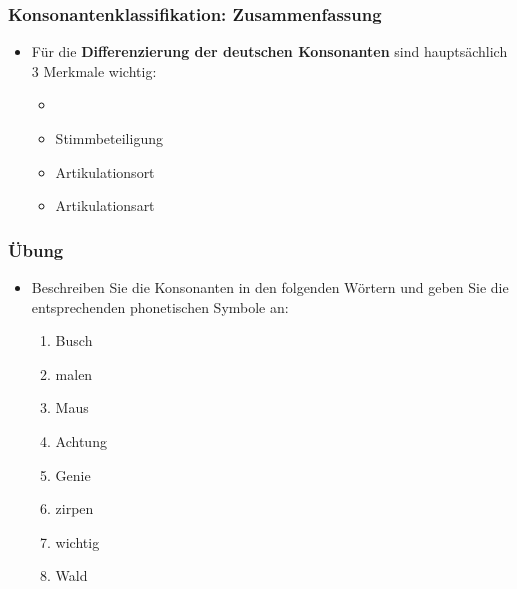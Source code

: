 
\begin{frame}
\frametitle{Konsonantenklassifikation: Zusammenfassung}

	\begin{itemize}
		\item Für die \textbf{Differenzierung der deutschen Konsonanten} sind hauptsächlich 3 Merkmale wichtig:
		
		\begin{itemize}
			\item[]
			\item Stimmbeteiligung
			\item Artikulationsort
			\item Artikulationsart
		\end{itemize}
	\end{itemize}

\end{frame}


\begin{frame}

  \frametitle{Übung}

\begin{itemize}
	\item [] Beschreiben Sie die Konsonanten in den folgenden Wörtern und geben Sie die entsprechenden phonetischen Symbole an:

		 	\begin{enumerate}
		 		\item Busch
		 		\item malen
		 		\item Maus
		 		\item Achtung
		 		\item Genie
		 		\item zirpen
		 		\item wichtig
		 		\item Wald
		 	\end{enumerate}

\end{itemize}
\end{frame}


